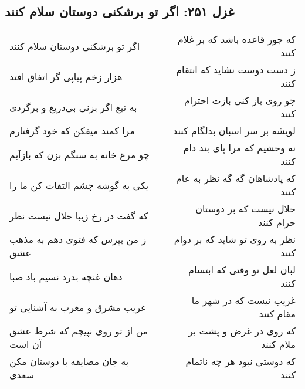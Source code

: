 \begin{center}
\section*{غزل ۲۵۱: اگر تو برشکنی دوستان سلام کنند}
\label{sec:251}
\begin{longtable}{l p{0.5cm} r}
اگر تو برشکنی دوستان سلام کنند
&&
که جور قاعده باشد که بر غلام کنند
\\
هزار زخم پیاپی گر اتفاق افتد
&&
ز دست دوست نشاید که انتقام کنند
\\
به تیغ اگر بزنی بی‌دریغ و برگردی
&&
چو روی باز کنی بازت احترام کنند
\\
مرا کمند میفکن که خود گرفتارم
&&
لویشه بر سر اسبان بدلگام کنند
\\
چو مرغ خانه به سنگم بزن که بازآیم
&&
نه وحشیم که مرا پای بند دام کنند
\\
یکی به گوشه چشم التفات کن ما را
&&
که پادشاهان گه گه نظر به عام کنند
\\
که گفت در رخ زیبا حلال نیست نظر
&&
حلال نیست که بر دوستان حرام کنند
\\
ز من بپرس که فتوی دهم به مذهب عشق
&&
نظر به روی تو شاید که بر دوام کنند
\\
دهان غنچه بدرد نسیم باد صبا
&&
لبان لعل تو وقتی که ابتسام کنند
\\
غریب مشرق و مغرب به آشنایی تو
&&
غریب نیست که در شهر ما مقام کنند
\\
من از تو روی نپیچم که شرط عشق آن است
&&
که روی در غرض و پشت بر ملام کنند
\\
به جان مضایقه با دوستان مکن سعدی
&&
که دوستی نبود هر چه ناتمام کنند
\\
\end{longtable}
\end{center}

